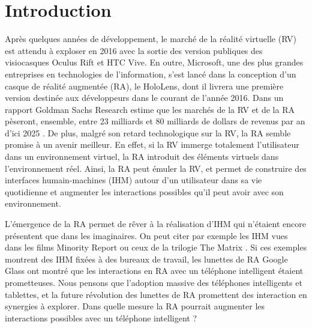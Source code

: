 \section*{Introduction}
Après quelques années de développement, le marché de la réalité virtuelle (RV) est attendu à exploser en 2016 avec la sortie des version publiques des visiocasques Oculus Rift et HTC Vive. En outre, Microsoft, une des plus grandes entreprises en technologies de l'information, s'est lancé dans la conception d'un casque de réalité augmentée (RA), le HoloLens, dont il livrera une première version destinée aux développeurs dans le courant de l'année 2016. Dans un rapport Goldman Sachs Research estime que les marchés de la RV et de la RA pèseront, ensemble, entre 23 milliards et 80 milliards de dollars de revenus par an d'ici 2025 \citep{BelliniChenSugiyamaEtAl2016}. De plus, malgré son retard technologique sur la RV, la RA semble promise à un avenir meilleur. \citep{BelliniChenSugiyamaEtAl2016} En effet, si la RV immerge totalement l'utilisateur dans un environnement virtuel, la RA introduit des éléments virtuels dans l'environnement réel. Ainsi, la RA peut émuler la RV, et permet de construire des interfaces humain-machines (IHM) autour d'un utilisateur dans sa vie quotidienne et augmenter les interactions possibles qu'il peut avoir avec son environnement.

L'émergence de la RA permet de rêver à la réalisation d'IHM qui n'étaient encore présentent que dans les imaginaires. On peut citer par exemple les IHM vues dans les films Minority Report  ou ceux de la trilogie The Matrix . Si ces exemples montrent des IHM fixées à des bureaux de travail, les lunettes de RA Google Glass ont montré que les interactions en RA avec un téléphone intelligent étaient prometteuses. Nous pensons que l'adoption massive des téléphones intelligents et tablettes, et la future révolution des lunettes de RA promettent des interaction en synergies à explorer. Dans quelle mesure la RA pourrait augmenter les interactions possibles avec un téléphone intelligent ?



